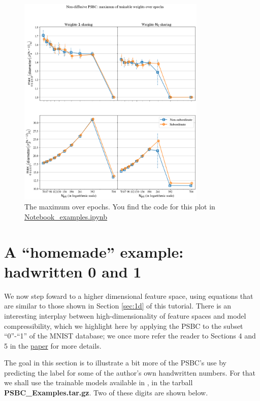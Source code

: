 \documentclass[openany,twoside]{book}
\begin{document}
\begin{figure}[htbp]
\centering
\includegraphics[width=0.8\textwidth]{figures/max_non-dif.png}
\caption{The maximum over epochs. You find the code for this plot in \href{https://github.com/rafael-a-monteiro-math/Binary_classification_phase_separation/blob/master/Notebook_PSBC_examples.ipynb}{Notebook\_examples.ipynb}}
\end{figure}


\hypertarget{a-homemade-example-hadwritten-0-and-1}{%
\section{A ``homemade'' example: hadwritten 0 and 1}\label{a-homemade-example-hadwritten-0-and-1}}

We now step foward to a higher dimensional feature space, using equations that are similar to those shown in Section \ref{sec:1d} of this tutorial. There is an interesting interplay between high-dimensionality of feature spaces and model compressibility, which we highlight here by applying the PSBC to the subset ``0''-``1'' of the MNIST database; we once more refer the reader to Sections 4 and 5 in the \href{https://arxiv.org/abs/2009.02467}{paper} for more details.

The goal in this section is to illustrate a bit more of the PSBC's use by predicting the label for some of the author's own handwritten numbers. For that we shall use the trainable models available in \citep{Bin_phase_data}, in the tarball \textbf{PSBC\_Examples.tar.gz}. Two of these digits are shown below.
\end{document}

